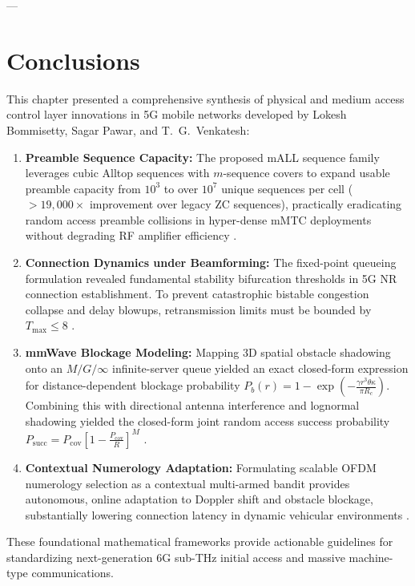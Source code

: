 ---

\section{Conclusions}
\label{sec:5g_summary}

This chapter presented a comprehensive synthesis of physical and medium access control layer innovations in 5G mobile networks developed by Lokesh Bommisetty, Sagar Pawar, and T.~G.~Venkatesh:
\begin{enumerate}
    \item \textbf{Preamble Sequence Capacity:} The proposed mALL sequence family leverages cubic Alltop sequences with $m$-sequence covers to expand usable preamble capacity from $10^3$ to over $10^7$ unique sequences per cell ($> 19{,}000\times$ improvement over legacy ZC sequences), practically eradicating random access preamble collisions in hyper-dense mMTC deployments without degrading RF amplifier efficiency \cite{pawar2023high}.
    \item \textbf{Connection Dynamics under Beamforming:} The fixed-point queueing formulation revealed fundamental stability bifurcation thresholds in 5G NR connection establishment. To prevent catastrophic bistable congestion collapse and delay blowups, retransmission limits must be bounded by $T_{\max} \le 8$ \cite{bommisetty2023connection}.
    \item \textbf{mmWave Blockage Modeling:} Mapping 3D spatial obstacle shadowing onto an $M/G/\infty$ infinite-server queue yielded an exact closed-form expression for distance-dependent blockage probability $P_b(r) = 1 - \exp\left(-\frac{\gamma r^3 \theta \kappa}{\pi R_c}\right)$. Combining this with directional antenna interference and lognormal shadowing yielded the closed-form joint random access success probability $P_{\mathrm{succ}} = P_{\mathrm{cov}} \left[ 1 - \frac{P_{\mathrm{cov}}}{R} \right]^M$ \cite{bommisetty2022mmwave}.
    \item \textbf{Contextual Numerology Adaptation:} Formulating scalable OFDM numerology selection as a contextual multi-armed bandit provides autonomous, online adaptation to Doppler shift and obstacle blockage, substantially lowering connection latency in dynamic vehicular environments \cite{bommisetty2024contextual}.
\end{enumerate}

These foundational mathematical frameworks provide actionable guidelines for standardizing next-generation 6G sub-THz initial access and massive machine-type communications.